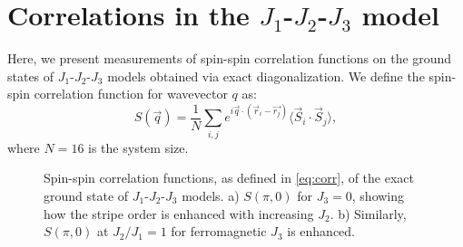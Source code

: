 \documentclass[amsmath,amssymb,aps,prb,superscriptaddress,onecolumn,floatfix]{revtex4}
\begin{document}


\section{Correlations in the $J_1$-$J_2$-$J_3$ model}

Here, we present measurements of spin-spin correlation functions on the ground states of $J_1$-$J_2$-$J_3$ models obtained via exact diagonalization.
We define the spin-spin correlation function for wavevector $q$ as:
\begin{equation}
\label{eq:corr}
    S(\vec{q}) = \frac{1}{N} \sum_{i, j} e^{i \vec{q}\cdot (\vec{r}_i - \vec{r_j})} \langle \vec{S}_i \cdot \vec{S}_j \rangle,
\end{equation}
where $N=16$ is the system size.

\begin{figure*}[htp]
    \centering
    
    \caption{Spin-spin correlation functions, as defined in \autoref{eq:corr}, of the exact ground state of $J_1$-$J_2$-$J_3$ models. a) $S(\pi, 0)$ for $J_3 = 0$, showing how the stripe order is enhanced with increasing $J_2$. b) Similarly, $S(\pi, 0)$ at $J_2/J_1 = 1$ for ferromagnetic $J_3$ is enhanced.
    }
    \label{fig:corr}
\end{figure*}
\end{document}
